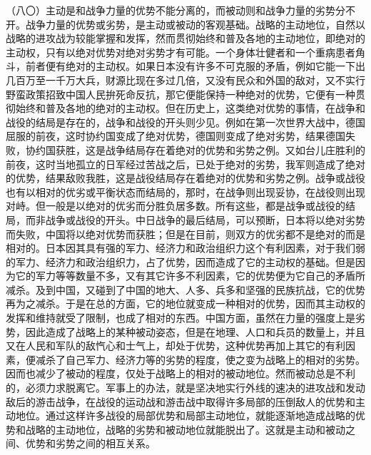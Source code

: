 （八〇）主动是和战争力量的优势不能分离的，而被动则和战争力量的劣势分不开。战争力量的优势或劣势，是主动或被动的客观基础。战略的主动地位，自然以战略的进攻战为较能掌握和发挥，然而贯彻始终和普及各地的主动地位，即绝对的主动权，只有以绝对优势对绝对劣势才有可能。一个身体壮健者和一个重病患者角斗，前者便有绝对的主动权。如果日本没有许多不可克服的矛盾，例如它能一下出几百万至一千万大兵，财源比现在多过几倍，又没有民众和外国的敌对，又不实行野蛮政策招致中国人民拚死命反抗，那它便能保持一种绝对的优势，它便有一种贯彻始终和普及各地的绝对的主动权。但在历史上，这类绝对优势的事情，在战争和战役的结局是存在的，战争和战役的开头则少见。例如在第一次世界大战中，德国屈服的前夜，这时协约国变成了绝对优势，德国则变成了绝对劣势，结果德国失败，协约国获胜，这是战争结局存在着绝对的优势和劣势之例。又如台儿庄胜利的前夜，这时当地孤立的日军经过苦战之后，已处于绝对的劣势，我军则造成了绝对的优势，结果敌败我胜，这是战役结局存在着绝对的优势和劣势之例。战争或战役也有以相对的优劣或平衡状态而结局的，那时，在战争则出现妥协，在战役则出现对峙。但一般是以绝对的优劣而分胜负居多数。所有这些，都是战争或战役的结局，而非战争或战役的开头。中日战争的最后结局，可以预断，日本将以绝对劣势而失败，中国将以绝对优势而获胜；但是在目前，则双方的优劣都不是绝对的而是相对的。日本因其具有强的军力、经济力和政治组织力这个有利因素，对于我们弱的军力、经济力和政治组织力，占了优势，因而造成了它的主动权的基础。但是因为它的军力等等数量不多，又有其它许多不利因素，它的优势便为它自己的矛盾所减杀。及到中国，又碰到了中国的地大、人多、兵多和坚强的民族抗战，它的优势再为之减杀。于是在总的方面，它的地位就变成一种相对的优势，因而其主动权的发挥和维持就受了限制，也成了相对的东西。中国方面，虽然在力量的强度上是劣势，因此造成了战略上的某种被动姿态，但是在地理、人口和兵员的数量上，并且又在人民和军队的敌忾心和士气上，却处于优势，这种优势再加上其它的有利因素，便减杀了自己军力、经济力等的劣势的程度，使之变为战略上的相对的劣势。因而也减少了被动的程度，仅处于战略上的相对的被动地位。然而被动总是不利的，必须力求脱离它。军事上的办法，就是坚决地实行外线的速决的进攻战和发动敌后的游击战争，在战役的运动战和游击战中取得许多局部的压倒敌人的优势和主动地位。通过这样许多战役的局部优势和局部主动地位，就能逐渐地造成战略的优势和战略的主动地位，战略的劣势和被动地位就能脱出了。这就是主动和被动之间、优势和劣势之间的相互关系。

